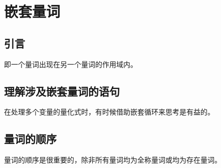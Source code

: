 
\section{嵌套量词}
{
    \subsection{引言}
    {
        即一个量词出现在另一个量词的作用域内。
    }

    \subsection{理解涉及嵌套量词的语句}
    {
        {
            在处理多个变量的量化式时，有时候借助嵌套循环来思考是有益的。
        }
    }

    \subsection{量词的顺序}
    {
        量词的顺序是很重要的，除非所有量词均为全称量词或均为存在量词。
    }
}
